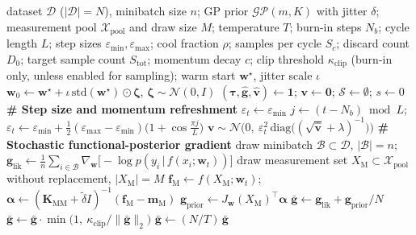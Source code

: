 \documentclass[11pt]{article}
\newcommand{\w}{\mathbf{w}}
\newcommand{\vv}{\mathbf{v}}
\newcommand{\XM}{X_{\mathrm{M}}}
\newcommand{\fM}{\mathbf{f}_{\mathrm{M}}}
\newcommand{\mM}{\mathbf{m}_{\mathrm{M}}}
\newcommand{\KMM}{\mathbf{K}_{\mathrm{MM}}}
\newcommand{\gp}{\mathcal{GP}}
\newcommand{\D}{\mathcal{D}}
\newcommand{\N}{\mathcal{N}}
\newcommand{\gbar}{\bar{\mathbf{g}}}
\newcommand{\vhat}{\hat{\mathbf{v}}}
\newcommand{\ghat}{\hat{\mathbf{g}}}
\newcommand{\btau}{\bm{\tau}}
\newcommand{\gradU}{\nabla \widetilde{U}}
\begin{document}
\begin{algorithm}[t]
\caption{Cyclical scale-adapted functional SGHMC (this codebase)}
\label{alg:fsghmc}
\begin{algorithmic}[1]
\Require dataset $\D$ ($|\D| = N$), minibatch size $n$; GP prior
  $\gp(m, K)$ with jitter $\delta$; measurement pool
  $\mathcal{X}_{\mathrm{pool}}$ and draw size $M$; temperature $T$;
  burn-in steps $N_b$; cycle length $L$; step sizes
  $\varepsilon_{\min}, \varepsilon_{\max}$; cool fraction $\rho$;
  samples per cycle $S_c$; discard count $D_0$; target sample count
  $S_{\mathrm{tot}}$; momentum decay $c$; clip threshold
  $\kappa_{\mathrm{clip}}$ (burn-in only, unless enabled for sampling);
  warm start $\w^{\star}$, jitter scale $\iota$
\State $\w_0 \gets \w^{\star} + \iota\,\mathrm{std}(\w^{\star})\odot
  \bm{\zeta}$, \quad $\bm{\zeta}\sim\N(0,I)$
\State $(\btau, \ghat, \vhat) \gets \mathbf{1}$;\quad
  $\vv \gets \mathbf{0}$;\quad
  $\mathcal{S} \gets \emptyset$;\quad
  $s \gets 0$
  \State \textbf{\# Step size and momentum refreshment}
   \quad $\varepsilon_t \gets \varepsilon_{\min}$
  \Else
    \State $j \gets (t - N_b) \bmod L$;\qquad
      $\varepsilon_t \gets \varepsilon_{\min} + \tfrac12
      (\varepsilon_{\max} - \varepsilon_{\min})
      \bigl(1 + \cos\tfrac{\pi j}{L}\bigr)$
     \quad
      $\vv \sim \N\bigl(0,\ \varepsilon_t^{2}\,
        \mathrm{diag}\bigl((\sqrt{\vhat}+\lambda)^{-1}\bigr)\bigr)$
    \EndIf
  \EndIf
  \State \textbf{\# Stochastic functional-posterior gradient}
  \State draw minibatch $\mathcal{B} \subset \D$, $|\mathcal{B}| = n$;\qquad
    $\mathbf{g}_{\mathrm{lik}} \gets \tfrac{1}{n} \sum_{i\in\mathcal{B}}
    \nabla_\w\bigl[-\log p(y_i\,|\,f(x_i;\w_t))\bigr]$
  \State draw measurement set $\XM \subset \mathcal{X}_{\mathrm{pool}}$
    without replacement, $|\XM| = M$
  \State $\fM \gets f(\XM;\w_t)$;\qquad
    $\bm{\alpha} \gets (\KMM + \tilde\delta I)^{-1}(\fM - \mM)$
  \State $\mathbf{g}_{\mathrm{prior}} \gets J_{\w}(\XM)^{\top}\bm{\alpha}$
  \State $\gbar \gets \mathbf{g}_{\mathrm{lik}}
    + \mathbf{g}_{\mathrm{prior}} / N$
    \State $\gbar \gets \gbar \cdot
      \min\bigl(1,\ \kappa_{\mathrm{clip}} / \lVert\gbar\rVert_2\bigr)$
  \EndIf
  \State $\gbar \gets (N / T)\,\gbar$
    \Comment{$= \tfrac{1}{T}\gradU(\w_t)$, Eq.~\eqref{eq:gradU}}

\end{algorithmic}
\end{algorithm}
\end{document}
